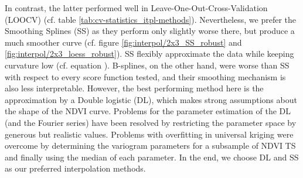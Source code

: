     In contrast, the latter performed well in Leave-One-Out-Cross-Validation (LOOCV) (cf. table \ref{tab:cv-statistics_itpl-methods}). Nevertheless, we prefer the Smoothing Splines (SS) as they perform only slightly worse there, but produce a much smoother curve (cf. figure \ref{fig:interpol/2x3_SS_robust} and \ref{fig:interpol/2x3_loess_robust}). SS flexibly approximate the data while keeping curvature low (cf. equation ). B-splines, on the other hand, were worse than SS with respect to every score function tested, and their smoothing mechanism is also less interpretable. However, the best performing method here is the approximation by a Double logistic (DL), which makes strong assumptions about the shape of the NDVI curve. Problems for the parameter estimation of the DL (and the Fourier series) have been resolved by restricting the parameter space by generous but realistic values. Problems with overfitting in universal kriging were overcome by determining the variogram parameters for a subsample of NDVI {TS} and finally using the median of each parameter. 
    In the end, we choose DL and SS as our preferred interpolation methods.





